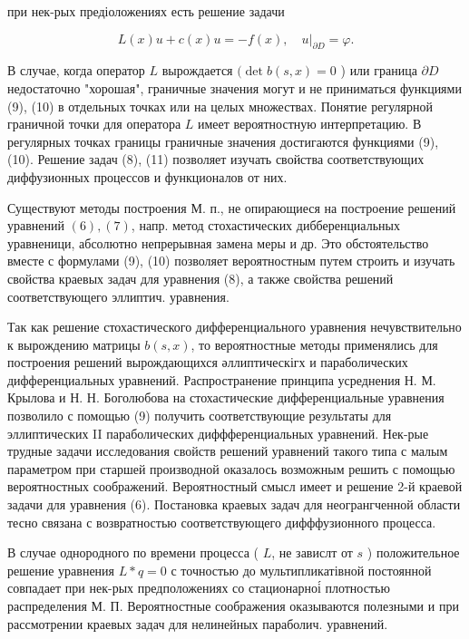 \documentclass[10pt]{article}
\begin{document}
при нек-рых предіоложениях есть решение задачи



\[

L(x) u+c(x) u=-f(x),\left.\quad u\right|_{\partial D}=\varphi .

\]



В случае, когда оператор $L$ вырождается $(\operatorname{det} b(s, x)=0$ ) или граница $\partial D$ недостаточно "хорошая", граничные значения могут и не приниматься функциями (9), (10) в отдельных точках или на целых множествах. Понятие регулярной граничной точки для оператора $L$ имеет вероятностную интерпретацию. В регулярных точках границы граничные значения достигаются функциями (9), (10). Решение задач (8), (11) позволяет изучать свойства соответствующих диффузионных процессов и функционалов от них.



Существуют методы построения М. п., не опирающиеся на построение решений уравнений $(6),(7)$, напр. метод стохастических дибберенциальных уравненици, абсолютно непрерывная замена меры и др. Это обстоятельство вместе с формулами (9), (10) позволяет вероятностным путем строить и изучать свойства краевых задач для уравнения (8), а также свойства решений соответствующего эллиптич. уравнения.



Так как решение стохастического дифференциального уравнения нечувствительно к вырождению матрицы $b(s, x)$, то вероятностные методы применялись для построения решений вырождающихся әллиптическігх и параболических дифференциальных уравнений. Распространение принципа усреднения Н. М. Крылова и Н. Н. Боголюбова на стохастические дифференциальные уравнения позволило с помощью (9) получить соответствующие результаты для эллиптических II параболических диффференциальных уравнений. Нек-рые трудные задачи исследования свойств решений уравнений такого типа с малым параметром при старшей производной оказалось возможным решить с помощью вероятностных соображений. Вероятностный смысл имеет и решение 2-й краевой задачи для уравнения (6). Постановка краевых задач для неогрангченной области тесно связана с возвратностью соответствующего дифффузионного процесса.



В случае однородного по времени процесса ( $L$, не завислт от $s$ ) положительное решение уравнения $L * q=0$ с точностью до мультипликатівной постоянной совпадает при нек-рых предположениях со стационарноі́ плотностью распределения М. П. Вероятностные соображения оказываются полезными и при рассмотрении краевых задач для нелинейных параболич. уравнений.
\end{document}
